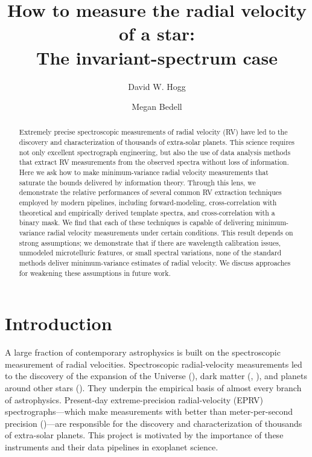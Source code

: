\documentclass[modern]{aastex631}
\newcommand{\acronym}[1]{\textsc{#1}}
\newcommand{\EPRV}{\acronym{EPRV}}
\newcommand{\RV}{\acronym{RV}}
\begin{document}
\title{How to measure the radial velocity of a star:\\The invariant-spectrum case}
\author[0000-0003-2866-9403]{David W. Hogg}

\author[0000-0001-9907-7742]{Megan Bedell}

\begin{abstract}\noindent
    Extremely precise spectroscopic measurements of radial velocity (\RV) have led to the discovery and characterization of thousands of extra-solar planets.
    This science requires not only excellent spectrograph engineering, but also the use of data analysis methods that extract RV measurements from the observed spectra without loss of information. 
    Here we ask how to make minimum-variance radial velocity measurements that saturate the bounds delivered by information theory. 
    Through this lens, we demonstrate the relative performances of several common RV extraction techniques employed by modern pipelines, including forward-modeling, cross-correlation with theoretical and empirically derived template spectra, and cross-correlation with a binary mask. 
    We find that each of these techniques is capable of delivering minimum-variance radial velocity measurements under certain conditions. 
    This result depends on strong assumptions; we demonstrate that if there are wavelength calibration issues, unmodeled microtelluric features, or small spectral variations, none of the standard methods deliver minimum-variance estimates of radial velocity. 
    We discuss approaches for weakening these assumptions in future work.
\end{abstract}


\section{Introduction}\label{sec:intro}

A large fraction of contemporary astrophysics is built on the spectroscopic measurement of radial velocities.
Spectroscopic radial-velocity measurements led to the discovery of the expansion of the Universe (\citealt{hubble}),
dark matter (\citealt{zwicky}, \citealt{rubin}),
and planets around other stars (\citealt{mayor}).
They underpin the empirical basis of almost every branch of astrophysics.
Present-day extreme-precision radial-velocity (\EPRV) spectrographs---which make measurements with better than meter-per-second precision (\citealt{what?})---are responsible for the discovery and characterization of thousands of extra-solar planets.
This project is motivated by the importance of these instruments and their data pipelines in exoplanet science.
\end{document}
